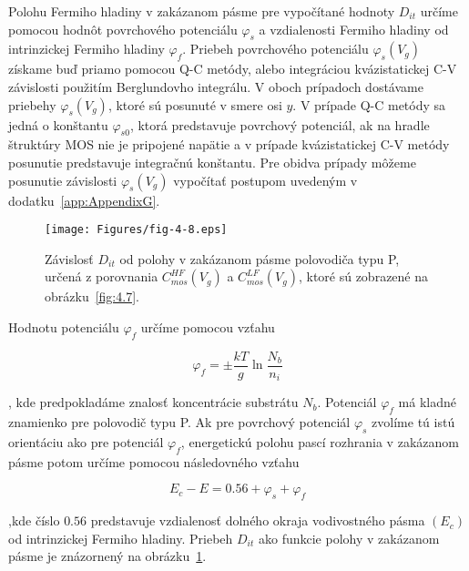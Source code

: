 \par Polohu Fermiho hladiny v zakázanom pásme pre vypočítané hodnoty
$D_{it}$ určíme pomocou hodnôt povrchového potenciálu $\varphi_{s}$ a
vzdialenosti Fermiho hladiny od intrinzickej Fermiho hladiny
$\varphi_{f}$. Priebeh povrchového potenciálu $\varphi_{s}(V_{g})$
získame buď priamo pomocou Q-C metódy, alebo integráciou
kvázistatickej C-V závislosti použitím Berglundovho integrálu. V oboch
prípadoch dostávame priebehy $\varphi_{s}(V_{g})$, ktoré sú posunuté v
smere osi $y$. V prípade Q-C metódy sa jedná o konštantu
$\varphi_{s0}$, ktorá predstavuje povrchový potenciál, ak na hradle
štruktúry MOS nie je pripojené napätie a v prípade kvázistatickej C-V
metódy posunutie predstavuje integračnú konštantu. Pre obidva prípady
môžeme posunutie závislosti $\varphi_{s}(V_{g})$ vypočítať postupom
uvedeným v dodatku~\ref{app:AppendixG}.

\begin{figure}[h!]\centering
  \texttt{[image: Figures/fig-4-8.eps]}
  \caption[Závislosť $D_{it}$ od polohy v zakázanom pásme polovodiča
    typu P, určená z porovnania $C_{mos}^{HF}(V_{g})$ a
    $C_{mos}^{LF}(V_{g})$]{Závislosť $D_{it}$ od polohy v zakázanom
    pásme polovodiča typu P, určená z porovnania $C_{mos}^{HF}(V_{g})$
    a $C_{mos}^{LF}(V_{g})$, ktoré sú zobrazené na
    obrázku~\ref{fig:4.7}.}\label{fig:4.8}
\end{figure}

Hodnotu potenciálu $\varphi_{f}$ určíme pomocou vzťahu

\begin{equation}\label{eq:4.16}
  \varphi_{f} = \pm \frac{kT}{g} \ln{\frac{N_{b}}{n_{i}}}
\end{equation}

, kde predpokladáme znalosť koncentrácie substrátu $N_{b}$. Potenciál
$\varphi_{f}$ má kladné znamienko pre polovodič typu P. Ak pre
povrchový potenciál $\varphi_{s}$ zvolíme tú istú orientáciu ako pre
potenciál $\varphi_{f}$, energetickú polohu pascí rozhrania v
zakázanom pásme potom určíme pomocou následovného vzťahu

\begin{equation}\label{eq:4.17}
  E_{c} - E = 0.56 + \varphi_{s} + \varphi_{f}
\end{equation}

,kde číslo $0.56$ predstavuje vzdialenosť dolného okraja vodivostného
pásma $(E_{c})$ od intrinzickej Fermiho hladiny. Priebeh $D_{it}$ ako
funkcie polohy v zakázanom pásme je znázornený na
obrázku~\ref{fig:4.8}.


